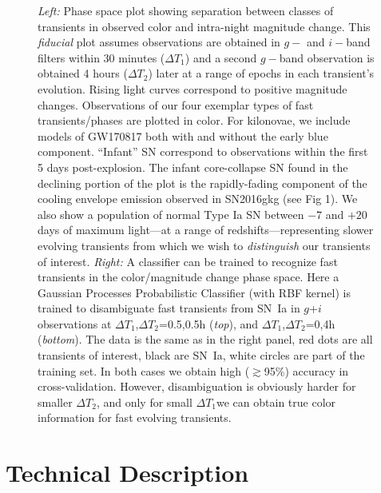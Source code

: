 \documentclass[12pt, letterpaper]{article}
\newcommand{\dtone}{\ensuremath{\Delta T_1}}
\newcommand{\dttwo}{\ensuremath{\Delta T_2}}
\begin{document}
\begin{center}
\begin{figure}[!h]
\begin{center}
\end{center}
\caption{{\scriptsize \emph{Left:} Phase space plot showing separation between classes of transients in observed color and intra-night magnitude change. This \emph{fiducial} plot assumes observations are obtained in $g-$ and $i-$band filters within 30 minutes (\dtone) and a second $g-$band observation is obtained 4 hours (\dttwo) later at a range of epochs in each transient's evolution. Rising light curves correspond to positive magnitude changes. Observations of our four exemplar types of fast transients/phases are plotted in color. For kilonovae, we include models of GW170817 both with and without the early blue component. ``Infant'' SN correspond to observations within the first 5 days post-explosion. The infant core-collapse SN found in the declining portion of the plot is the rapidly-fading component of the cooling envelope emission observed in SN2016gkg (see Fig 1). We also show a population of normal Type Ia SN between $-7$ and $+20$ days of maximum light---at a range of redshifts---representing slower evolving transients from which we wish to \emph{distinguish} our transients of interest. \emph{Right:} A classifier can be trained to recognize fast transients in the color/magnitude change phase space. Here a Gaussian Processes Probabilistic Classifier \citep{Rasmussen06gaussianprocesses} (with RBF kernel) is trained to disambiguate fast transients from SN~Ia in $g$+$i$ observations at \dtone,\dttwo=0.5,0.5h ({\em top}), and \dtone,\dttwo=0,4h ({\em bottom}). The data is the same as in the right panel, red dots are all transients of interest, black are SN~Ia, white circles are part of the training set. In both cases we obtain high ($\gtrsim$95\%) accuracy in cross-validation. However, disambiguation is obviously harder for smaller \dttwo, and only for small \dtone we can obtain true color information for fast evolving transients.}}
\end{figure}
\end{center}
\clearpage
\section{Technical Description}
\end{document}
